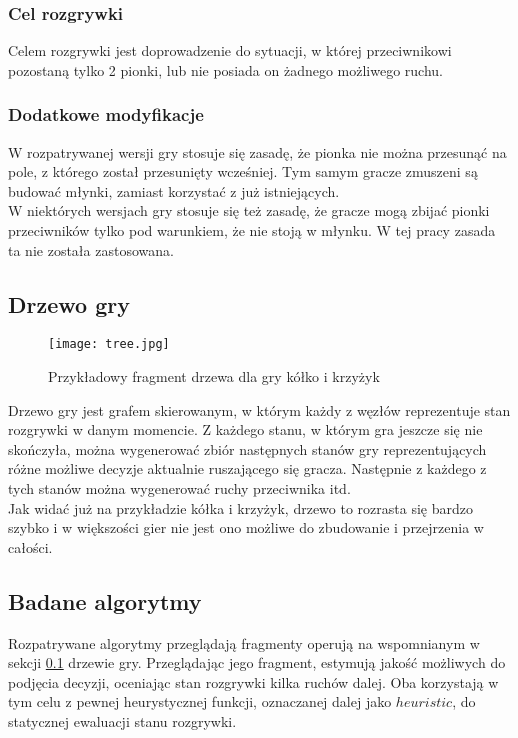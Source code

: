 \documentclass{article}
\begin{document}
	\subsubsection{Cel rozgrywki}
	Celem rozgrywki jest doprowadzenie do sytuacji, w której przeciwnikowi pozostaną tylko 2 pionki, lub nie posiada on żadnego możliwego ruchu.
	\subsubsection{Dodatkowe modyfikacje}
	W rozpatrywanej wersji gry stosuje się zasadę, że pionka nie można przesunąć na pole, z którego został przesunięty wcześniej. Tym samym gracze zmuszeni są budować młynki, zamiast korzystać z już istniejących.\\
	W niektórych wersjach gry stosuje się też zasadę, że gracze mogą zbijać pionki przeciwników tylko pod warunkiem, że nie stoją w młynku. W tej pracy zasada ta nie została zastosowana.
	\subsection{Drzewo gry}\label{sub:tree}
	\begin{figure}[H]
		\centering
		\texttt{[image: tree.jpg]}
		\caption{Przykładowy fragment drzewa dla gry kółko i krzyżyk}
		\label{fig:game_tree}
	\end{figure}
	Drzewo gry jest grafem skierowanym, w którym każdy z węzłów reprezentuje stan rozgrywki w danym momencie. Z każdego stanu, w którym gra jeszcze się nie skończyła, można wygenerować zbiór następnych stanów gry reprezentujących różne możliwe decyzje aktualnie ruszającego się gracza. Następnie z każdego z tych stanów można wygenerować ruchy przeciwnika itd.\\
	Jak widać już na przykładzie kółka i krzyżyk, drzewo to rozrasta się bardzo szybko i w większości gier nie jest ono możliwe do zbudowanie i przejrzenia w całości.
	\subsection{Badane algorytmy}
	Rozpatrywane algorytmy przeglądają fragmenty operują na wspomnianym w sekcji \ref{sub:tree} drzewie gry. Przeglądając jego fragment, estymują jakość możliwych do podjęcia decyzji, oceniając stan rozgrywki kilka ruchów dalej.
	Oba korzystają w tym celu z pewnej heurystycznej funkcji, oznaczanej dalej jako $heuristic$, do statycznej ewaluacji stanu rozgrywki.
\end{document}
